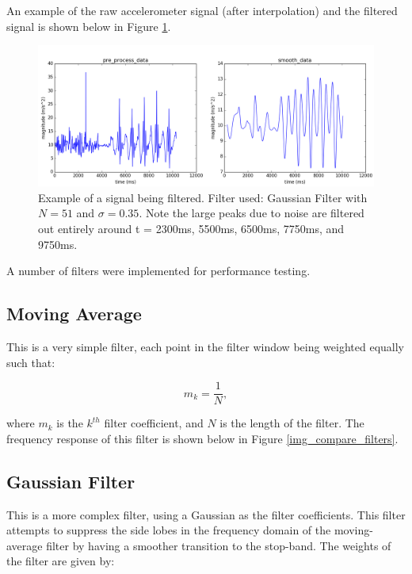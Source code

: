             An example of the raw accelerometer signal (after interpolation) and the filtered signal is shown below in Figure \ref{img_filtered_signal}.

            \begin{figure}[h]
                \includegraphics[width=\textwidth]{Images/filtered_signal.png}
                \centering
                \caption{Example of a signal being filtered. Filter used: Gaussian Filter with $N=51$ and $\sigma=0.35$. Note the large peaks due to noise are filtered out entirely around t = 2300ms, 5500ms, 6500ms, 7750ms, and 9750ms.}
                \label{img_filtered_signal}
            \end{figure}

            A number of filters were implemented for performance testing.

            \subsection{Moving Average}

                This is a very simple filter, each point in the filter window being weighted equally such that:

                \begin{equation}
                    m_k = \frac{1}{N},
                \end{equation}

                where $m_k$ is the $k^{th}$ filter coefficient, and $N$ is the length of the filter. The frequency response of this filter is shown below in Figure \ref{img_compare_filters}.

            \subsection{Gaussian Filter}

                This is a more complex filter, using a Gaussian as the filter coefficients. This filter attempts to suppress the side lobes in the frequency domain of the moving-average filter by having a smoother transition to the stop-band. The weights of the filter are given by:

